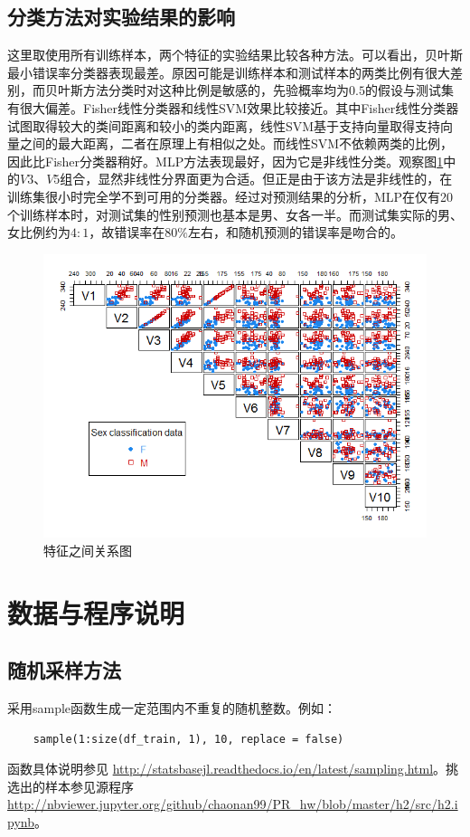 \subsection{分类方法对实验结果的影响}
这里取使用所有训练样本，两个特征的实验结果比较各种方法。可以看出，贝叶斯最小错误率分类器表现最差。原因可能是训练样本和测试样本的两类比例有很大差别，而贝叶斯方法分类时对这种比例是敏感的，先验概率均为$0.5$的假设与测试集有很大偏差。Fisher线性分类器和线性SVM效果比较接近。其中Fisher线性分类器试图取得较大的类间距离和较小的类内距离，线性SVM基于支持向量取得支持向量之间的最大距离，二者在原理上有相似之处。而线性SVM不依赖两类的比例，因此比Fisher分类器稍好。MLP方法表现最好，因为它是非线性分类。观察图\ref{fig:fr}中的$V3$、$V5$组合，显然非线性分界面更为合适。但正是由于该方法是非线性的，在训练集很小时完全学不到可用的分类器。经过对预测结果的分析，MLP在仅有20个训练样本时，对测试集的性别预测也基本是男、女各一半。而测试集实际的男、女比例约为$4:1$，故错误率在$80\%$左右，和随机预测的错误率是吻合的。

\begin{figure}
\centering
\includegraphics[width=15cm]{resource/feature_relation.png}
\caption{特征之间关系图}
\label{fig:fr}
\end{figure}

\section{数据与程序说明}
\subsection{随机采样方法}
采用{\ttfamily sample}函数生成一定范围内不重复的随机整数。例如：
\begin{lstlisting}
	sample(1:size(df_train, 1), 10, replace = false)
\end{lstlisting}
函数具体说明参见 \url{http://statsbasejl.readthedocs.io/en/latest/sampling.html}。挑选出的样本参见源程序 \url{http://nbviewer.jupyter.org/github/chaonan99/PR_hw/blob/master/h2/src/h2.ipynb}。

